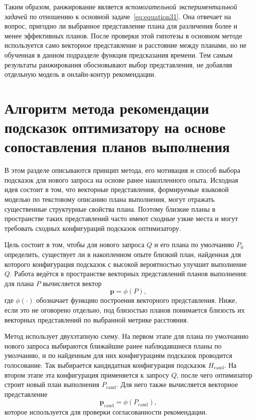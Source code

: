Таким образом, ранжирование является \emph{вспомогательной экспериментальной задачей} по отношению к основной задаче~\eqref{eq:equation31}. Она отвечает на вопрос, пригодно ли выбранное представление плана для различения более и менее эффективных планов. После проверки этой гипотезы в основном методе используется само векторное представление и расстояние между планами, но не обученная в данном подразделе функция предсказания времени. Тем самым результаты ранжирования обосновывают выбор представления, не добавляя отдельную модель в онлайн-контур рекомендации.



\section{Алгоритм метода рекомендации подсказок оптимизатору на основе сопоставления планов выполнения}
В этом разделе описываются принцип метода, его мотивация и способ выбора подсказок для нового запроса на основе ранее накопленного опыта. Исходная идея состоит в том, что векторные представления, формируемые языковой моделью по текстовому описанию плана выполнения, могут отражать существенные структурные свойства плана. Поэтому близкие планы в пространстве таких представлений часто имеют сходные узкие места и могут требовать сходных конфигураций подсказок оптимизатору. 

Цель состоит в том, чтобы для нового запроса $Q$ и его плана по умолчанию $P_0$ определить, существует ли в накопленном опыте близкий план, найденная для которого конфигурация подсказок с высокой вероятностью улучшит выполнение $Q$. Работа ведётся в пространстве векторных представлений планов выполнения: для плана $P$ вычисляется вектор 
\[ 
\mathbf{p}=\phi(P), 
\] 
где $\phi(\cdot)$ обозначает функцию построения векторного представления. Ниже, если это не оговорено отдельно, под близостью планов понимается близость их векторных представлений по выбранной метрике расстояния. 

Метод использует двухэтапную схему. На первом этапе для плана по умолчанию нового запроса выбираются ближайшие ранее наблюдавшиеся планы по умолчанию, и по найденным для них конфигурациям подсказок проводится голосование. Так выбирается кандидатная конфигурация подсказок $H_{\mathrm{cand}}$. На втором этапе эта конфигурация применяется к запросу $Q$, после чего оптимизатор строит новый план выполнения $P_{\mathrm{cand}}$. Для него также вычисляется векторное представление 
\[ 
\mathbf{p}_{\mathrm{cand}}=\phi(P_{\mathrm{cand}}), 
\] 
которое используется для проверки согласованности рекомендации. 

